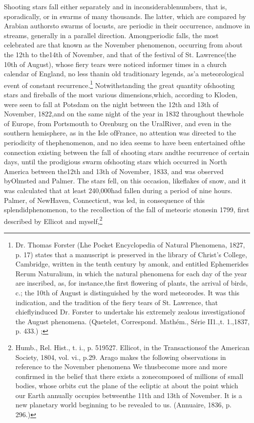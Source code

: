 Shooting stars fall either separately and in inconsiderablenumbers, that is, sporadically, or in swarms of many thousands. Ihe latter, which are compared by Arabian authorsto swarms of locusts, are periodic in their occurrence, andmove in streams, generally in a parallel direction. Amongperiodic falls, the most celebrated are that known as the November phenomenon, occurring from about the 12th to the14th of November, and that of the festival of St. Lawrence(the 10th of August), whose fiery tears were noticed informer times in a church calendar of England, no less thanin old traditionary legends, as'a meteorological event of constant recurrence.\footnote{Dr. Thomas Forster (Lhe Pocket Encyclopedia of Natural Phenomena, 1827, p. 17) states that a manuscript is preserved in the library of Christ's College, Cambridge, written in the tenth century by amonk, and entitled Ephemerides Rerum Naturalium, in which the natural phenomena for each day of the year are inscribed, as, for instance,the first flowering of plants, the arrival of birds, c.; the 10th of August is distinguished by the word  meteorodes. It was this indication, and the tradition of the fiery tears of St. Lawrence, that chieflyinduced Dr. Forster to undertake his extremely zealous investigationof the August phenomena. (Quetelet, Correspond. Math\'{e}m., S\'{e}rie II1.,t. 1.,1837, p. 433.) ;} Notwithstanding the great quantity ofshooting stars and fireballs of the most various dimensions,which, according to Kloden, were seen to fall at Potsdam on the night between the 12th and 13th of November, 1822,and on the same night of the year in 1832 throughout thewhole of Europe, from Portsmouth to Orenburg on the UralRiver, and even in the southern hemisphere, as in the Isle ofFrance, no attention was directed to the periodicity of thephenomenon, and no idea seems to have been entertained ofthe connection existing between the fall of shooting stars andthe recurrence of certain days, until the prodigious swarm ofshooting stars which occurred in North America between the12th and 13th of November, 1833, and was observed byOlmsted and Palmer. The stars fell, on this occasion, likeflakes of snow, and it was calculated that at least 240,000had fallen during a period of nine hours. Palmer, of NewHaven, Connecticut, was led, in consequence of this splendidphenomenon, to the recollection of the fall of meteoric stonesin 1799, first described by Ellicot and myself,\footnote{Humb., Rel. Hist., t. i., p. 519527. Ellicot, in the Transactionsof the American Society, 1804, vol. vi., p.29. Arago makes the following observations in reference to the November phenomena  We thusbecome more and more confirmed in the belief that there exists a zonecomposed of millions of small bodies, whose orbits cut the plane of the ecliptic at about the point which our Earth annually occupies betweenthe 11th and 13th of November. It is a new planetary world beginning to be revealed to us. (Annuaire, 1836, p. 296.)

}
